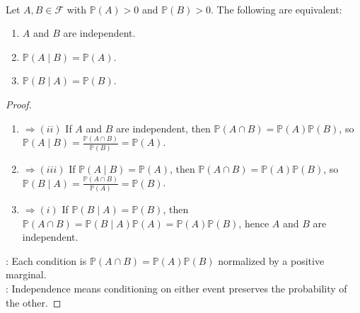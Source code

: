 \begin{proposition} \label{prop:independence-via-conditioning} \\
Let $A,B\in\mathcal{F}$ with $\mathbb{P}(A)>0$ and $\mathbb{P}(B)>0$. The following are equivalent:
\begin{enumerate}[label=(\roman*)]
\setlength{\itemsep}{0pt}
\item $A$ and $B$ are independent.
\item $\mathbb{P}(A\mid B)=\mathbb{P}(A)$.
\item $\mathbb{P}(B\mid A)=\mathbb{P}(B)$.
\end{enumerate}
\begin{proof}
\begin{enumerate}[label=(\roman*)]
\setlength{\itemsep}{0pt}
\item[$(i)$]$\Rightarrow (ii)$ If $A$ and $B$ are independent, then $\mathbb{P}(A\cap B)=\mathbb{P}(A)\mathbb{P}(B)$, so $\mathbb{P}(A\mid B)=\frac{\mathbb{P}(A\cap B)}{\mathbb{P}(B)}=\mathbb{P}(A)$.
\item[$(ii)$]$\Rightarrow (iii)$ If $\mathbb{P}(A\mid B)=\mathbb{P}(A)$, then $\mathbb{P}(A\cap B)=\mathbb{P}(A)\mathbb{P}(B)$, so $\mathbb{P}(B\mid A)=\frac{\mathbb{P}(A\cap B)}{\mathbb{P}(A)}=\mathbb{P}(B)$.
\item[$(iii)$]$\Rightarrow (i)$ If $\mathbb{P}(B\mid A)=\mathbb{P}(B)$, then $\mathbb{P}(A\cap B)=\mathbb{P}(B\mid A)\mathbb{P}(A)=\mathbb{P}(A)\mathbb{P}(B)$, hence $A$ and $B$ are independent.
\end{enumerate}
: Each condition is $\mathbb{P}(A\cap B)=\mathbb{P}(A)\mathbb{P}(B)$ normalized by a positive marginal.\\
: Independence means conditioning on either event preserves the probability of the other.
\end{proof}
\end{proposition}

